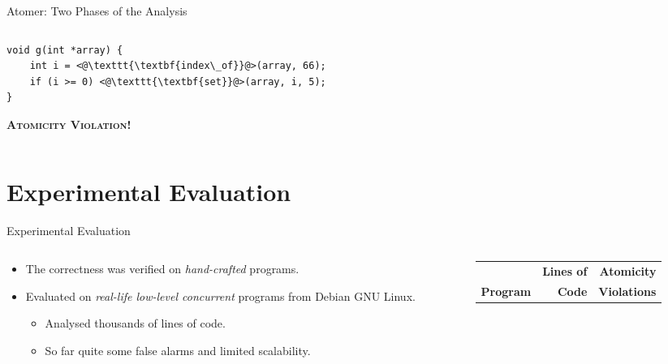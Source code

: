 \documentclass[10pt, hyperref={unicode}, aspectratio=169]{beamer}
\begin{document}
\begin{frame}[fragile]{Atomer: Two Phases of the Analysis}
\begin{columns}
\begin{column}[T]{.5 \linewidth}
            \begin{lstlisting}
void g(int *array) {
    int i = <@\texttt{\textbf{index\_of}}@>(array, 66);
    if (i >= 0) <@\texttt{\textbf{set}}@>(array, i, 5);
}
            \end{lstlisting}

            \alert{\textbf{\textsc{Atomicity Violation!}}}
        \end{column}
    \end{columns}
\end{frame}


\section{Experimental Evaluation}
\begin{frame}{Experimental Evaluation}
    \begin{columns}
        \begin{column}{.5 \textwidth}
            \begin{itemize}\setlength\itemsep{1.5em}
                \item
                    The \alert{correctness} was verified
                    on \emph{hand-crafted} programs.

                \item
                    Evaluated on \emph{real-life low-level concurrent}
                    programs from Debian GNU Linux.

                    \smallskip

                    \begin{itemize}\setlength\itemsep{1em}
                        \item
                            Analysed thousands of lines of code.

                        \item
                            So far quite some false alarms and
                            limited scalability.
                    \end{itemize}
            \end{itemize}
        \end{column}

        \begin{column}{.5 \textwidth}
            \def\arraystretch{1.3}

            \begin{tabular}{lrr}
                & \textbf{Lines of} & \alert{\textbf{Atomicity}} \\
                \textbf{Program} & \textbf{Code}
                    & \alert{\textbf{Violations}} \\ \hline


\end{tabular}
\end{column}
\end{columns}
\end{frame}
\end{document}

